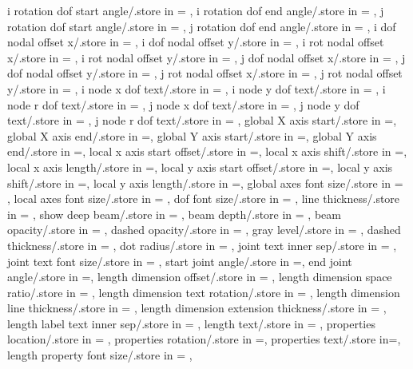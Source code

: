 {i rotation dof start angle/.store in = \irotdofstartangle,
i rotation dof end angle/.store in = \irotdofendangle,
j rotation dof start angle/.store in = \jrotdofstartangle,
j rotation dof end angle/.store in = \jrotdofendangle, 
i dof nodal offset x/.store in = \idofnodaloffsetx,
i dof nodal offset y/.store in = \idofnodaloffsety,
i rot nodal offset x/.store in = \irotnodaloffsetx,
i rot nodal offset y/.store in = \irotnodaloffsety,
j dof nodal offset x/.store in = \jdofnodaloffsetx,
j dof nodal offset y/.store in = \jdofnodaloffsety,
j rot nodal offset x/.store in = \jrotnodaloffsetx,
j rot nodal offset y/.store in = \jrotnodaloffsety,
i node x dof text/.store in = \inodexdoftext,
i node y dof text/.store in = \inodeydoftext,
i node r dof text/.store in = \inoderdoftext,
j node x dof text/.store in = \jnodexdoftext,
j node y dof text/.store in = \jnodeydoftext,
j node r dof text/.store in = \jnoderdoftext,
global X axis start/.store in =\globalXstart,
global X axis end/.store in =\globalXend,
global Y axis start/.store in =\globalYstart,
global Y axis end/.store in =\globalYend,
local x axis start offset/.store in =\localxstartoffset,
local x axis shift/.store in =\localxshift,
local x axis length/.store in =\localxlength,
local y axis start offset/.store in =\localystartoffset,
local y axis shift/.store in =\localyshift,
local y axis length/.store in =\localylength,
global axes font size/.store in = \globalaxesfontsize,
local axes font size/.store in = \localaxesfontsize,
dof font size/.store in = \doffontsize,
line thickness/.store in = \linethickness,
show deep beam/.store in = \showdeep,
beam depth/.store in = \beamdepth,
beam opacity/.store in = \beamopa,
dashed opacity/.store in = \dashedopa,
gray level/.store in = \graylevel,
dashed thickness/.store in = \dashedthk,
dot radius/.store in = \dotradius,
joint text inner sep/.store in = \jointinnersep,
joint text font size/.store in = \jointtextfontsize,
start joint angle/.store in =\startjointangle,
end joint angle/.store in =\endjointangle,
length dimension offset/.store in = \lengthdimoffset,
length dimension space ratio/.store in = \lengthdimspaceratio,
length dimension text rotation/.store in = \lengthlabelrotation,
length dimension line thickness/.store in = \lengthdimlinethick,
length dimension extension thickness/.store in = \lengthdimextthick,
length label text inner sep/.store in = \lengthlabeltextinnersep,
length text/.store in = \lengthtext,
properties location/.store in = \propertyloc,
properties rotation/.store in =\propertyrotation,
properties text/.store in=\propertiestext,
length property font size/.store in = \lengthpropfontsize,
}
